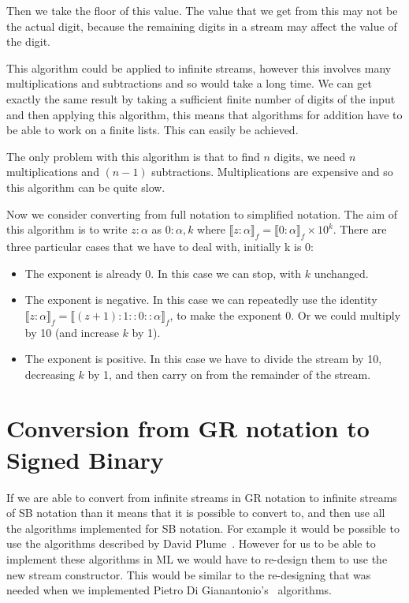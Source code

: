 \documentclass{cs4rep}
\begin{document}
Then we take the floor of this value. The value that we get from this
may not be the actual digit, because the remaining digits in a stream
may affect the value of the digit.

This algorithm could be applied to infinite streams, however this
involves many multiplications and subtractions and so would take a
long time. We can get exactly the same result by taking a
sufficient finite number of digits of the input and then applying this
algorithm, this means that algorithms for addition have to be able to
work on a finite lists. This can easily be achieved.

The only problem with this algorithm is that to find $n$ digits, we
need $n$ multiplications and $(n-1)$ subtractions. Multiplications are
expensive and so this algorithm can be quite slow.

Now we consider converting from full notation to simplified notation.
The aim of this algorithm is to write $z:\alpha$ as $0:\alpha, k$
where $\llbracket z:\alpha \rrbracket_{f} = \llbracket 0:\alpha
\rrbracket_{f} \times 10^{k}$. There are three particular cases that
we have to deal with, initially k is 0:

\begin{itemize}
\item The exponent is already 0. In this case we can stop, with $k$
  unchanged.
\item The exponent is negative. In this case we can repeatedly use the
  identity $\llbracket z:\alpha \rrbracket_{f} = \llbracket
  (z+1):1::0::\alpha \rrbracket_{f}$, to make the exponent 0. Or we
  could multiply by 10 (and increase $k$ by 1).
\item The exponent is positive. In this case we have to divide the
  stream by 10, decreasing $k$ by 1, and then carry on from the
  remainder of the stream.
\end{itemize}


\section{Conversion from GR notation to Signed Binary}
If we are able to convert from infinite streams in GR notation to
infinite streams of SB notation than it means that it is possible to
convert to, and then use all the algorithms implemented for SB
notation. For example it would be possible to use the algorithms
described by David Plume~\cite{kn:Plume}. However for us to be able to
implement these algorithms in ML we would have to re-design them to
use the new stream constructor. This would be similar to the
re-designing that was needed when we implemented Pietro Di
Gianantonio's~\cite{kn:DiGianantonio} algorithms.
\end{document}
